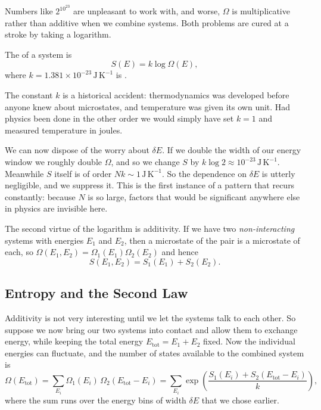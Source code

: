 \documentclass[a4paper]{scrartcl}
\begin{document}
Numbers like $2^{10^{23}}$ are unpleasant to work with, and worse, $\Omega$ is multiplicative rather than additive when we combine systems. Both problems are cured at a stroke by taking a logarithm.

\begin{definition}
	The  of a system is
	$$
	S(E) = k \log \Omega(E),
	$$
	where $k = 1.381 \times 10^{-23}\,\mathrm{J}\,\mathrm{K}^{-1}$ is .
\end{definition}

The constant $k$ is a historical accident: thermodynamics was developed before anyone knew about microstates, and temperature was given its own unit. Had physics been done in the other order we would simply have set $k = 1$ and measured temperature in joules.

We can now dispose of the worry about $\delta E$. If we double the width of our energy window we roughly double $\Omega$, and so we change $S$ by $k \log 2 \approx 10^{-23}\,\mathrm{J}\,\mathrm{K}^{-1}$. Meanwhile $S$ itself is of order $Nk \sim 1\,\mathrm{J}\,\mathrm{K}^{-1}$. So the dependence on $\delta E$ is utterly negligible, and we suppress it. This is the first instance of a pattern that recurs constantly: because $N$ is so large, factors that would be significant anywhere else in physics are invisible here.

The second virtue of the logarithm is additivity. If we have two \emph{non-interacting} systems with energies $E_1$ and $E_2$, then a microstate of the pair is a microstate of each, so $\Omega(E_1, E_2) = \Omega_1(E_1)\Omega_2(E_2)$ and hence
$$
S(E_1, E_2) = S_1(E_1) + S_2(E_2).
$$

\subsection{Entropy and the Second Law}

Additivity is not very interesting until we let the systems talk to each other. So suppose we now bring our two systems into contact and allow them to exchange energy, while keeping the total energy $E_{\mathrm{tot}} = E_1 + E_2$ fixed. Now the individual energies can fluctuate, and the number of states available to the combined system is
$$
\Omega(E_{\mathrm{tot}}) = \sum_{E_i} \Omega_1(E_i)\, \Omega_2(E_{\mathrm{tot}} - E_i) = \sum_{E_i} \exp\left( \frac{S_1(E_i) + S_2(E_{\mathrm{tot}} - E_i)}{k}\right),
$$
where the sum runs over the energy bins of width $\delta E$ that we chose earlier.
\end{document}
